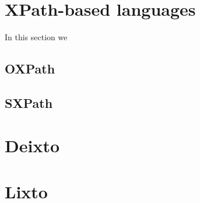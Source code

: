 \section{XPath-based languages}
In this section we
\subsection{OXPath}
\subsection{SXPath}

\section{Deixto}

\section{Lixto}
